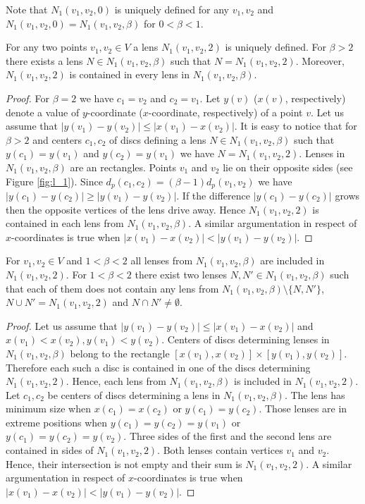 \documentclass[11pt]{llncs}
\begin{document}
Note that $N_1(v_1, v_2,0)$ is uniquely defined for any $v_1,v_2$ 
and $N_1(v_1, v_2,0)=N_1(v_1, v_2,\beta)$ for $0<\beta<1$.\\


\begin{lemma}
\label{l1-betabig}
For any two points $v_1,v_2 \in V$ a lens $N_1(v_1,v_2,2)$ is uniquely defined. 
For $\beta > 2$ there exists a lens $N \in N_1(v_1,v_2,\beta)$ such that $N=N_1(v_1,v_2,2)$. 
Moreover,  $N_1(v_1,v_2,2)$ is contained in every lens in $N_1(v_1,v_2,\beta)$.
\end{lemma}
\begin{proof} 
For $\beta=2$ we have $c_1=v_2$ and $c_2=v_1$.
Let $y(v)$ ($x(v)$, respectively) denote a value of $y$-coordinate ($x$-coordinate, respectively)
of a point $v$. Let us assume that $|y(v_1)-y(v_2)| \leq |x(v_1)-x(v_2)|$.
It is easy to notice that for $\beta > 2$ and centers $c_1, c_2$ of discs defining a lens 
$N \in N_1(v_1,v_2,\beta)$ such that
$y(c_1)=y(v_1)$ and $y(c_2)=y(v_1)$ we have $N=N_1(v_1,v_2,2)$.
Lenses in $N_1(v_1,v_2,\beta)$ are an rectangles. Points $v_1$ and $v_2$ lie on their opposite sides
(see Figure \ref{fig:l_1}). Since $d_p(c_1, c_2)=(\beta -1)d_p(v_1,v_2)$ we have 
$|y(c_1)-y(c_2)| \geq |y(v_1)-y(v_2)|$. If the difference $|y(c_1)-y(c_2)|$ grows then 
the opposite vertices of the lens drive away. Hence $N_1(v_1,v_2,2)$ is contained in each lens 
from $N_1(v_1,v_2,\beta)$. A similar argumentation in respect of $x$-coordinates is true when 
$|x(v_1)-x(v_2)|<|y(v_1)-y(v_2)|$.        
\end{proof} 

\begin{lemma}
\label{l1-twolenses}
For $v_1,v_2 \in V$ and $1 < \beta < 2$ all lenses from $N_1(v_1,v_2,\beta)$ are
included in $N_1(v_1,v_2,2)$.
For $1 < \beta < 2$ there exist two lenses $N, N' \in N_1(v_1,v_2,\beta)$ such that each of them 
does not contain any lens from $N_1(v_1,v_2,\beta) \setminus \{N, N'\}$, $N \cup N' = N_1(v_1,v_2,2)$
and $N \cap N' \neq \emptyset$. 
\end{lemma}
\begin{proof}
Let us assume that $|y(v_1)-y(v_2)| \leq |x(v_1)-x(v_2)|$ and $x(v_1)<x(v_2), y(v_1)<y(v_2)$.
Centers of discs determining lenses in $N_1(v_1,v_2,\beta)$ belong to the rectangle 
$[x(v_1),x(v_2)] \times [y(v_1),y(v_2)]$. Therefore each such a disc is contained in one of the discs
determining $N_1(v_1,v_2,2)$. Hence, each lens from $N_1(v_1,v_2,\beta)$ is included 
in $N_1(v_1,v_2,2)$. 
Let $c_1, c_2$ be centers of discs determining a lens in $N_1(v_1,v_2,\beta)$. The lens has
minimum size when $x(c_1)=x(c_2)$ or $y(c_1)=y(c_2)$. Those lenses are in extreme positions
when $y(c_1)=y(c_2)=y(v_1)$ or $y(c_1)=y(c_2)=y(v_2)$. Three sides of the first and the second
lens are contained in sides of $N_1(v_1,v_2,2)$. Both lenses contain vertices $v_1$ and $v_2$.
Hence, their intersection is not empty and their sum is $N_1(v_1,v_2,2)$. 
A similar argumentation in respect of $x$-coordinates is true when $|x(v_1)-x(v_2)|<|y(v_1)-y(v_2)|$.
\end{proof}
\end{document}
